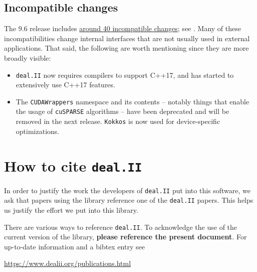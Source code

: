 \documentclass{ansarticle-preprint}
\newcommand{\specialword}[1]{\texttt{#1}}
\newcommand{\dealii}{{\specialword{deal.II}}\xspace}
\newcommand{\kokkos}{{\specialword{Kokkos}}\xspace}
\begin{document}
\subsection{Incompatible changes}\label{subsec:deprecated}

The 9.6 release includes
\href{https://dealii.org/developer/doxygen/deal.II/changes_between_9_5_2_and_9_6_0.html}
     {around 40 incompatible changes};
see \cite{changes96}. Many of these
incompatibilities change internal
interfaces that are not usually used in external
applications. That said, the following are worth mentioning since they
are more broadly visible:
\begin{itemize}
  \item \dealii{} now requires compilers to support C++17, and has
    started to extensively use C++17 features.
  \item The \texttt{CUDAWrappers} namespace and its contents --
    notably things that enable the usage of \texttt{cuSPARSE} algorithms --
    have been deprecated and will be removed in the next
    release. \kokkos{} is now used for device-specific optimizations.
\end{itemize}



\section{How to cite \dealii}\label{sec:cite}

In order to justify the work the developers of \dealii put into this
software, we ask that papers using the library reference one of the
\dealii papers. This helps us justify the effort we put into this library.

There are various ways to reference \dealii. To acknowledge the use of
the current version of the library, \textbf{please reference the present
  document}. For up-to-date information and a bibtex entry
see
\begin{center}
  \url{https://www.dealii.org/publications.html}
\end{center}
\end{document}
